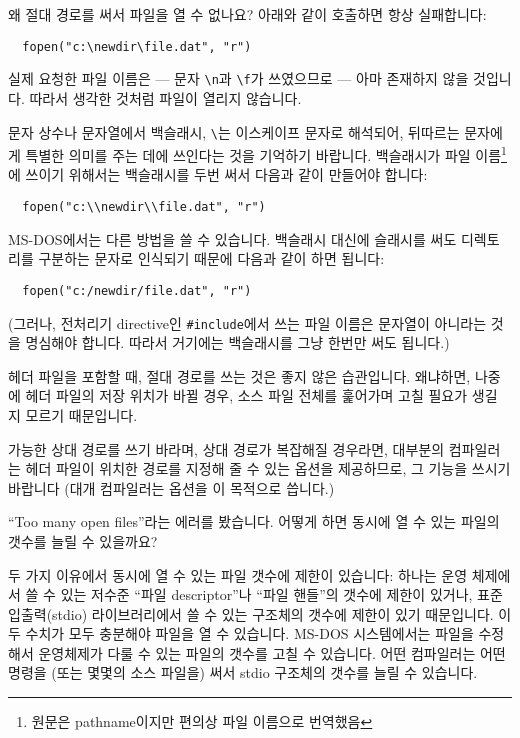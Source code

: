 \begin{faq}
	왜 절대 경로를 써서 파일을 열 수 없나요?
	아래와 같이 호출하면 항상 실패합니다:
\begin{verbatim}
  fopen("c:\newdir\file.dat", "r")
\end{verbatim}

\A
	실제 요청한 파일 이름은 --- 문자 \verb+\n+과 \verb+\f+가 쓰였으므로
	--- 아마 존재하지 않을 것입니다.  따라서 생각한 것처럼 파일이
	열리지 않습니다.

	문자 상수나 문자열에서 백슬래시, \verb+\+는 이스케이프 문자로
	해석되어, 뒤따르는 문자에게 특별한 의미를 주는 데에 쓰인다는 것을
	기억하기 바랍니다.  백슬래시가 파일 이름\footnote{원문은
	pathname이지만 편의상 파일 이름으로 번역했음}에 쓰이기 위해서는
	백슬래시를 두번 써서 다음과 같이 만들어야 합니다:

\begin{verbatim}
  fopen("c:\\newdir\\file.dat", "r")
\end{verbatim}

	MS-DOS에서는 다른 방법을 쓸 수 있습니다.  백슬래시 대신에
	슬래시를 써도 디렉토리를 구분하는 문자로 인식되기 때문에
	다음과 같이 하면 됩니다:

\begin{verbatim}
  fopen("c:/newdir/file.dat", "r")
\end{verbatim}

	(그러나, 전처리기 directive인 \verb+#include+에서 쓰는
	파일 이름은 문자열이 아니라는 것을 명심해야 합니다.
	따라서 거기에는 백슬래시를 그냥 한번만 써도 됩니다.)

\T
	헤더 파일을 포함할 때, 절대 경로를 쓰는 것은 좋지 않은 습관입니다.
	왜냐하면, 나중에 헤더 파일의 저장 위치가 바뀔 경우, 소스 파일
	전체를 훑어가며 고칠 필요가 생길 지 모르기 때문입니다.

	가능한 상대 경로를 쓰기 바라며, 상대 경로가 복잡해질 경우라면,
	대부분의 컴파일러는 헤더 파일이 위치한 경로를 지정해 줄 수 있는
	옵션을 제공하므로, 그 기능을 쓰시기 바랍니다
	(대개 컴파일러는  옵션을 이 목적으로 씁니다.)
\end{faq}

\begin{faq}
	``Too many open files''라는 에러를 봤습니다.
	어떻게 하면 동시에 열 수 있는 파일의 갯수를 늘릴 수 있을까요?

	두 가지 이유에서 동시에 열 수 있는 파일 갯수에 제한이 있습니다:
	하나는 운영 체제에서 쓸 수 있는 저수준 ``파일 descriptor''나 
	``파일 핸들''의 갯수에 제한이 있거나, 표준 입출력(stdio) 라이브러리에서
	쓸 수 있는  구조체의 갯수에 제한이 있기 때문입니다.
	이 두 수치가 모두 충분해야 파일을 열 수 있습니다.
	MS-DOS 시스템에서는  파일을 수정해서 운영체제가
	다룰 수 있는 파일의 갯수를 고칠 수 있습니다.
	어떤 컴파일러는 어떤 명령을 (또는 몇몇의 소스 파일을) 써서 
	stdio  구조체의 갯수를 늘릴 수 있습니다.
\end{faq}

